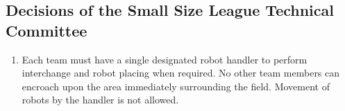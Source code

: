 \subsection*{Decisions of the Small Size League Technical Committee}
\begin{enumerate}
\item
Each team must have a single designated robot handler to perform interchange and robot placing when required.
No other team members can encroach upon the area immediately surrounding the field.
Movement of robots by the handler is not allowed.
\end{enumerate}